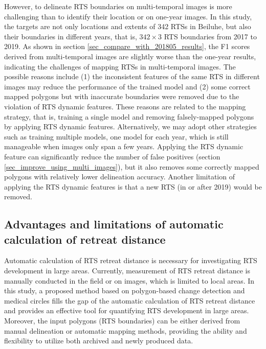 \documentclass[authoryear,preprint,review,12pt]{elsarticle}
\begin{document}
However, to delineate RTS boundaries on multi-temporal images is more challenging than to identify their location or on one-year images. 
In this study, the targets are not only locations and extents of 342 RTSs in Beiluhe, but also their boundaries in different years, that is, $342\times3$ RTS boundaries from 2017 to 2019.
As shown in section \ref{sec_compare_with_201805_results}, the F1 scores derived from multi-temporal images are slightly worse than the one-year results, indicating the challenges of mapping RTSs in multi-temporal images. 
The possible reasons include (1) the inconsistent features of the same RTS in different images may reduce the performance of the trained model 
and (2) some correct mapped polygons but with inaccurate boundaries were removed due to the violation of RTS dynamic features. 
These reasons are related to the mapping strategy, that is, training a single model and removing falsely-mapped polygons by applying RTS dynamic features.  
Alternatively, we may adopt other strategies such as training multiple models, one model for each year,  which is still manageable when images only span a few years.
Applying the RTS dynamic feature can significantly reduce the number of false positives (section \ref{sec_improve_using_multi_images}), but it also removes some correctly mapped polygons with relatively lower delineation accuracy. 
Another limitation of applying the RTS dynamic features is that a new RTS (in or after 2019) would be removed. 



\subsection{Advantages and limitations of automatic calculation of retreat distance}
\label{sec_diss_retreat_distance}

Automatic calculation of RTS retreat distance is necessary for investigating RTS development in large areas.
Currently, measurement of RTS retreat distance is manually conducted in the field or on images, which is limited to local areas. 
In this study, a proposed method based on polygon-based change detection and medical circles fills the gap of the automatic calculation of RTS retreat distance 
and provides an effective tool for quantifying RTS development in large areas. 
Moreover, the input polygons (RTS boundaries) can be either derived from manual delineation or automatic mapping methods, 
providing the ability and flexibility to utilize both archived and newly produced data.
\end{document}

